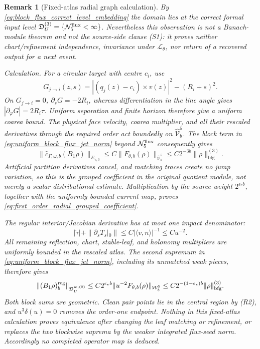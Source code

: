 \documentclass[11pt]{amsart}
\theoremstyle{compactplain}
\theoremstyle{compactdefinition}
\theoremstyle{compactremark}
\newtheorem*{remark*}{Remark}
\newcommand{\Ltransfer}{\mathscr L}
\begin{document}
\begin{remark*}[Fixed-atlas radial graph calculation]
By \eqref{eq:block_flux_correct_level_embedding} the domain lies at the
correct formal input level
\(\mathfrak D_U^{(3)}=\{\mathcal N_5^{\rm flux}<\infty\}\).  Nevertheless
this observation is not a Banach-module theorem and not the source-side clause
(S1): it proves neither chart/refinement independence, invariance under
\(\Ltransfer_\theta\), nor return of a recovered output for a next event.

\par\noindent\emph{Calculation.}
For a circular target with centre \(c_i\), use
\[
 G_{j\to i}(z,s)
 =|(q_j(z)-c_i)\times v(z)|^2-(R_i+s)^2.
\]
On \(G_{j\to i}=0\), \(\partial_sG=-2R_i\), whereas differentiation in the
line angle gives \(|\partial_\varphi G|=2R_i\tau\).  Uniform separation and
finite horizon therefore give a uniform coarea bound.  The physical face
velocity, coarea multiplier, and all their rescaled derivatives through the
required order act boundedly on
\(\widehat{\mathcal V}_b^5\).  The block term in
\eqref{eq:uniform_block_flux_jet_norm} beyond
\(\mathcal N_5^{\rm flux}\) consequently gives
\[
 \|\widehat c_{\Gamma,\omega,b}(B_1\rho)\|_{E_{\widehat\gamma,0}}
 \le C\|F_{\theta,b}(\rho)\|_{\widehat{\mathcal V}_b^5}
 \le C2^{-3b}\|\rho\|_{\mathrm{bfg}}^{(3)}.
\]
Artificial partition derivatives cancel, and matching traces create no jump
variation, so this is the grouped coefficient in the original quotient
module, not merely a scalar distributional estimate.  Multiplication by the
source weight \(2^{\epsilon_*b}\), together with the uniformly bounded current
map, proves
\eqref{eq:first_order_radial_grouped_coefficient}.

The regular interior/Jacobian derivative has at most one impact denominator:
\[
 |\dot\tau|+\|\partial_sT_s|_0\|
 \le C|\langle v,n\rangle|^{-1}\le Cu^{-2}.
\]
All remaining reflection, chart, stable-leaf, and holonomy multipliers are
uniformly bounded in the rescaled atlas.  The second supremum in
\eqref{eq:uniform_block_flux_jet_norm}, including its unmatched weak pieces,
therefore gives
\[
 \|(B_1\rho)^{\rm reg}_b\|_{\mathfrak D_U^{w,(0)}}
 \le C2^{\epsilon_*b}
 \|u^{-2}F_{\theta,b}(\rho)\|_{\mathcal W_b^5}
 \le C2^{-(1-\epsilon_*)b}\|\rho\|_{\mathrm{bfg}}^{(3)}.
\]
Both block sums are geometric.  Clean pair points lie in the central region
by (R2), and \(u^3\delta(u)=0\) removes the order-one endpoint.  Nothing in
this fixed-atlas calculation proves equivalence after changing the leaf
matching or refinement, or replaces the two blockwise suprema by the weaker
integrated flux-seed norm.  Accordingly no completed operator map is deduced.
\end{remark*}
\end{document}
